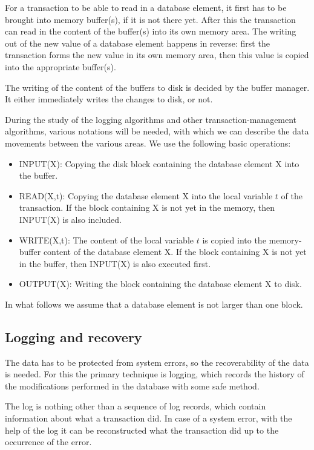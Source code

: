\documentclass[margin=0px]{article}
\begin{document}
For a transaction to be able to read in a database element, it first has to be brought into memory buffer(s), if it is not there yet.
After this the transaction can read in the content of the buffer(s) into its own memory area. The writing out of the new
value of a database element happens in reverse: first the transaction forms the new value in its own memory area, then this
value is copied into the appropriate buffer(s).

The writing of the content of the buffers to disk is decided by the buffer manager. It either immediately writes the changes to disk, or not.

During the study of the logging algorithms and other transaction-management algorithms, various notations will be needed,
with which we can describe the data movements between the various areas. We use the following basic operations:

\begin{itemize}
    \item	INPUT(X): Copying the disk block containing the database element X into the buffer.
    \item	READ(X,t): Copying the database element X into the local variable $t$ of the transaction. If the block containing X is not yet
          in the memory, then INPUT(X) is also included.
    \item	WRITE(X,t): The content of the local variable $t$ is copied into the memory-buffer content of the database element X. If the block containing X
          is not yet in the buffer, then INPUT(X) is also executed first.
    \item	OUTPUT(X): Writing the block containing the database element X to disk.
\end{itemize}

\noindent In what follows we assume that a database element is not larger than one block.

\subsection{Logging and recovery}

The data has to be protected from system errors, so the recoverability of the data is needed. For this the primary
technique is logging, which records the history of the modifications performed in the database with some safe method.

The log is nothing other than a sequence of log records, which contain information about what
a transaction did. In case of a system error, with the help of the log it can be reconstructed what the transaction did up to the occurrence of the error.
\end{document}
